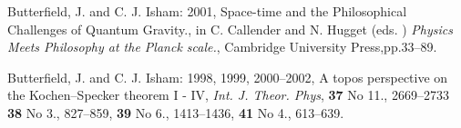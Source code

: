 \documentclass[12pt]{article}
\theoremstyle{plain}
\theoremstyle{definition}
\numberwithin{equation}{section}
\begin{document}
\begin{thebibliography}{9}

Butterfield, J. and C. J. Isham: 2001, Space-time and the
Philosophical Challenges of Quantum Gravity., in C. Callender and
N. Hugget (eds. ) \emph{Physics Meets Philosophy at the Planck
scale.}, Cambridge University Press,pp.33--89.

Butterfield, J. and C. J. Isham: 1998, 1999, 2000--2002, A topos
perspective on the Kochen--Specker theorem I - IV, \emph{Int. J.
Theor. Phys}, \textbf{37}  No 11., 2669--2733 \textbf{38} No 3.,
827--859, \textbf{39} No 6., 1413--1436, \textbf{41} No 4.,
613--639.

\end{thebibliography}
\end{document}
